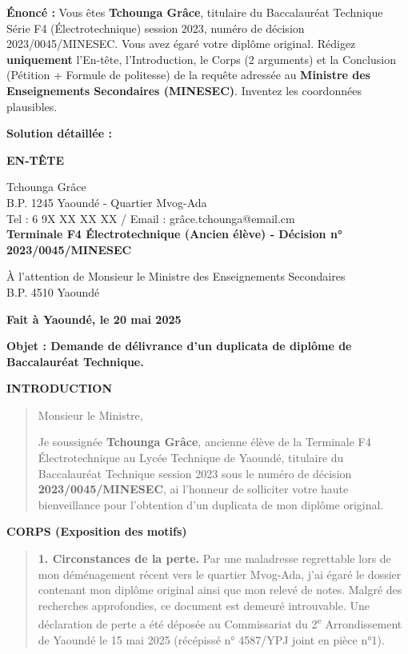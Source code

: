 \documentclass[11pt]{article}
\begin{document}
\begin{exoresolu}
\textbf{Énoncé :} Vous êtes \textbf{Tchounga Grâce}, titulaire du Baccalauréat Technique Série F4 (Électrotechnique) session 2023, numéro de décision 2023/0045/MINESEC. Vous avez égaré votre diplôme original. Rédigez \textbf{uniquement} l'En-tête, l'Introduction, le Corps (2 arguments) et la Conclusion (Pétition + Formule de politesse) de la requête adressée au \textbf{Ministre des Enseignements Secondaires (MINESEC)}. Inventez les coordonnées plausibles.

\tcblower
\textbf{Solution détaillée :}

\textbf{EN-TÊTE}
\begin{flushleft}
Tchounga Grâce \\
B.P. 1245 Yaoundé - Quartier Mvog-Ada \\
Tel : 6 9X XX XX XX / Email : grâce.tchounga@email.cm \\
\textbf{Terminale F4 Électrotechnique (Ancien élève) - Décision n° 2023/0045/MINESEC}
\vspace{0.5cm}

À l'attention de Monsieur le Ministre des Enseignements Secondaires \\
B.P. 4510 Yaoundé \\
\vspace{0.5cm}

\textbf{Fait à Yaoundé, le 20 mai 2025}

\textbf{Objet : Demande de délivrance d'un duplicata de diplôme de Baccalauréat Technique.}
\end{flushleft}

\textbf{INTRODUCTION}
\begin{quote}
Monsieur le Ministre,

Je soussignée \textbf{Tchounga Grâce}, ancienne élève de la Terminale F4 Électrotechnique au Lycée Technique de Yaoundé, titulaire du Baccalauréat Technique session 2023 sous le numéro de décision \textbf{2023/0045/MINESEC}, ai l'honneur de solliciter votre haute bienveillance pour l'obtention d'un duplicata de mon diplôme original.
\end{quote}

\textbf{CORPS (Exposition des motifs)}
\begin{quote}
\textbf{1. Circonstances de la perte.} Par une maladresse regrettable lors de mon déménagement récent vers le quartier Mvog-Ada, j'ai égaré le dossier contenant mon diplôme original ainsi que mon relevé de notes. Malgré des recherches approfondies, ce document est demeuré introuvable. Une déclaration de perte a été déposée au Commissariat du 2\textsuperscript{e} Arrondissement de Yaoundé le 15 mai 2025 (récépissé n° 4587/YPJ joint en pièce n°1).


\end{quote}
\end{exoresolu}
\end{document}
